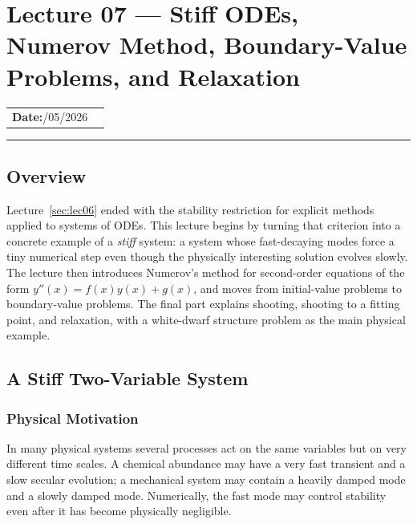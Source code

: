 
\section{Lecture 07 — Stiff ODEs, Numerov Method, Boundary-Value
  Problems, and Relaxation}\label{sec:lec07}

\begin{center}
\begin{tabular}{ll}
  \textbf{Date:}\quad 07/05/2026 & \\
\end{tabular}
\end{center}
\hrule\vspace{1.5em}

\subsection*{Overview}
Lecture~\ref{sec:lec06} ended with the stability restriction for explicit
methods applied to systems of ODEs. This lecture begins by turning that
criterion into a concrete example of a \emph{stiff} system: a system whose
fast-decaying modes force a tiny numerical step even though the physically
interesting solution evolves slowly. The lecture then introduces Numerov's
method for second-order equations of the form
$y''(x)=f(x)y(x)+g(x)$, and moves from initial-value problems to
boundary-value problems. The final part explains shooting, shooting to a
fitting point, and relaxation, with a white-dwarf structure problem as the
main physical example.

\subsection{A Stiff Two-Variable System}\label{subsec:lec07:stiff-example}

\subsubsection*{Physical Motivation}
In many physical systems several processes act on the same variables but on
very different time scales. A chemical abundance may have a very fast
transient and a slow secular evolution; a mechanical system may contain a
heavily damped mode and a slowly damped mode. Numerically, the fast mode may
control stability even after it has become physically negligible.

